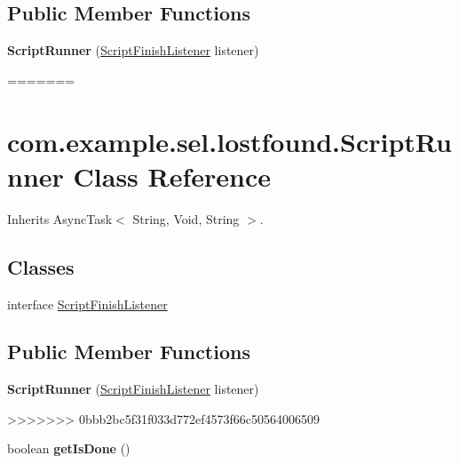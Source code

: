 \subsection*{Public Member Functions}
\begin{DoxyCompactItemize}
\item 
\hypertarget{classcom_1_1example_1_1sel_1_1lostfound_1_1ScriptRunner_a89fe364ebf708a526d2271b2aaad65dc}{{\bfseries Script\-Runner} (\hyperlink{interfacecom_1_1example_1_1sel_1_1lostfound_1_1ScriptRunner_1_1ScriptFinishListener}{Script\-Finish\-Listener} listener)}\label{classcom_1_1example_1_1sel_1_1lostfound_1_1ScriptRunner_a89fe364ebf708a526d2271b2aaad65dc}
=======
\hypertarget{classcom_1_1example_1_1sel_1_1lostfound_1_1ScriptRunner}{\section{com.\-example.\-sel.\-lostfound.\-Script\-Runner \-Class \-Reference}
\label{classcom_1_1example_1_1sel_1_1lostfound_1_1ScriptRunner}
}


\-Inherits \-Async\-Task$<$ String, Void, String $>$.

\subsection*{\-Classes}
\begin{DoxyCompactItemize}
\item 
interface \hyperlink{interfacecom_1_1example_1_1sel_1_1lostfound_1_1ScriptRunner_1_1ScriptFinishListener}{\-Script\-Finish\-Listener}
\end{DoxyCompactItemize}
\subsection*{\-Public \-Member \-Functions}
\begin{DoxyCompactItemize}
\item 
\hypertarget{classcom_1_1example_1_1sel_1_1lostfound_1_1ScriptRunner_a89fe364ebf708a526d2271b2aaad65dc}{{\bfseries \-Script\-Runner} (\hyperlink{interfacecom_1_1example_1_1sel_1_1lostfound_1_1ScriptRunner_1_1ScriptFinishListener}{\-Script\-Finish\-Listener} listener)}\label{classcom_1_1example_1_1sel_1_1lostfound_1_1ScriptRunner_a89fe364ebf708a526d2271b2aaad65dc}
>>>>>>> 0bbb2bc5f31f033d772ef4573f66c50564006509

\item 
\hypertarget{classcom_1_1example_1_1sel_1_1lostfound_1_1ScriptRunner_a9f6500f6f9fda5c4230dbbba9724b8bd}{boolean {\bfseries get\-Is\-Done} ()}\label{classcom_1_1example_1_1sel_1_1lostfound_1_1ScriptRunner_a9f6500f6f9fda5c4230dbbba9724b8bd}


\end{DoxyCompactItemize}
\end{DoxyCompactItemize}
